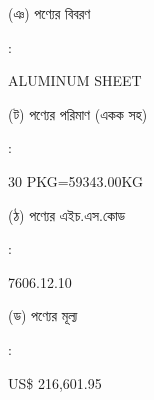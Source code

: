 \documentclass[12pt]{article}
\newcommand{\good}{ALUMINUM SHEET}
\newcommand{\pkg}{30 PKG=59343.00KG}
\newcommand{\hscode}{7606.12.10}
\newcommand{\price}{US\$ 216,601.95}
\begin{document}
\begin{minipage}[t]{0.45\linewidth}
(ঞ) পণ্যের বিবরণ
\end{minipage}
\begin{minipage}[t]{0.02\linewidth}
:
\end{minipage}
\begin{minipage}[t]{0.50\linewidth}
{\good}
\\
\end{minipage}
\begin{minipage}[t]{0.05\linewidth}
\hspace*{1em}
\end{minipage}
\begin{minipage}[t]{0.45\linewidth}
(ট) পণ্যের পরিমাণ (একক সহ)
\end{minipage}
\begin{minipage}[t]{0.02\linewidth}
:
\end{minipage}
\begin{minipage}[t]{0.50\linewidth}
{\pkg}
\\
\end{minipage}
\begin{minipage}[t]{0.05\linewidth}
\hspace*{1em}
\end{minipage}
\begin{minipage}[t]{0.45\linewidth}
(ঠ) পণ্যের এইচ.এস.কোড
\end{minipage}
\begin{minipage}[t]{0.02\linewidth}
:
\end{minipage}
\begin{minipage}[t]{0.50\linewidth}
{\hscode}
\\
\end{minipage}
\begin{minipage}[t]{0.05\linewidth}
\hspace*{1em}
\end{minipage}
\begin{minipage}[t]{0.45\linewidth}
(ড) পণ্যের মূল্য
\end{minipage}
\begin{minipage}[t]{0.02\linewidth}
:
\end{minipage}
\begin{minipage}[t]{0.50\linewidth}
{\price}
\\
\end{minipage}
\begin{minipage}[t]{0.05\linewidth}
\hspace*{1em}
\end{minipage}
\end{document}
